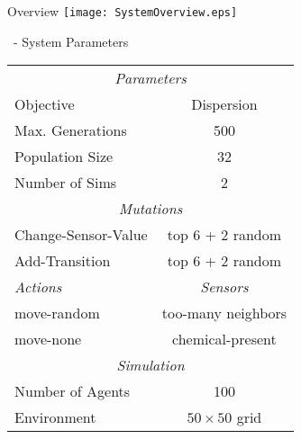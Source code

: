 %


\begin{slide}{\ECS Overview}
  \vspace{.15\textheight}
  \texttt{[image: SystemOverview.eps]}
\end{slide}


\begin{slide}{\ECS~- System Parameters}
  \centering
  \tiny
  \begin{tabular}{|lc|}
    \hline
    \multicolumn{2}{|c|}{\em{Parameters}} \\
    Objective & Dispersion \\
    Max. Generations & 500 \\
    Population Size  & 32  \\
    Number of Sims   & 2   \\	
    \hline
    \hline
    \multicolumn{2}{|c|}{\em{Mutations}}   \\
    Change-Sensor-Value & top 6 + 2 random \\
    Add-Transition      & top 6 + 2 random \\
    \hline
    \hline
    \em{Actions} & \em{Sensors}       \\
    move-random  & too-many neighbors \\
    move-none    & chemical-present   \\
    \hline
    \multicolumn{2}{|c|}{\em{Simulation}} \\
    Number of Agents & 100                \\
    Environment & $50 \times 50$ grid     \\
    \hline 
  \end{tabular}
\end{slide}

